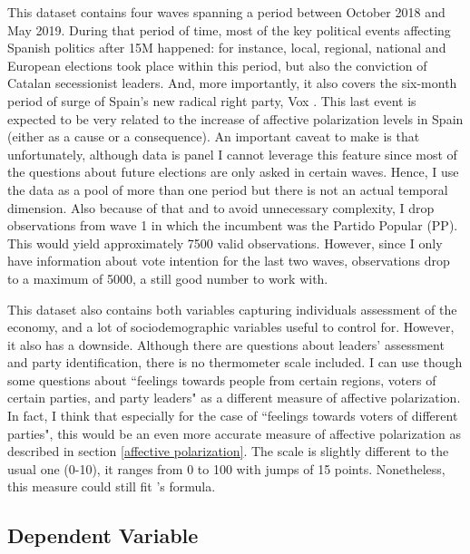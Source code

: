 \documentclass[a4paper, svgnames]{article}
\begin{document}
This dataset contains four waves spanning a period between October 2018 and May 2019. During that period of time, most of the key political events affecting Spanish politics after 15M happened: for instance, local, regional, national and European elections took place within this period, but also the conviction of Catalan secessionist leaders. And, more importantly, it also covers the six-month period of surge of Spain's new radical right party, Vox \citep{Torcal2020}. This last event is expected to be very related to the increase of affective polarization levels in Spain (either as a cause or a consequence). An important caveat to make is that unfortunately, although data is panel I cannot leverage this feature since most of the questions about future elections are only asked in certain waves. Hence, I use the data as a pool of more than one period but there is not an actual temporal dimension. Also because of that and to avoid unnecessary complexity, I drop observations from wave 1 in which the incumbent was the Partido Popular (PP). This would yield approximately 7500 valid observations. However, since I only have information about vote intention for the last two waves, observations drop to a maximum of 5000, a still good number to work with.

This dataset also contains both variables capturing individuals assessment of the economy, and a lot of sociodemographic variables useful to control for. However, it also has a downside. Although there are questions about leaders' assessment and party identification, there is no thermometer scale included. I can use though some questions about ``feelings towards people from certain regions, voters of certain parties, and party leaders" as a different measure of affective polarization. In fact, I think that especially for the case of ``feelings towards voters of different parties", this would be an even more accurate measure of affective polarization as described in section \ref{affective polarization}. The scale is slightly different to the usual one (0-10), it ranges from 0 to 100 with jumps of 15 points. Nonetheless, this measure could still fit \cite{Wagner2021}'s formula.

\subsection{Dependent Variable}
\end{document}
